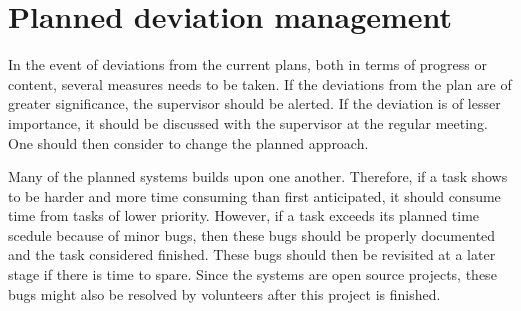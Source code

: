 \chapter{Planned deviation management}

In the event of deviations from the current plans, both in terms of progress or content, several measures needs to be taken. If the deviations from the plan are of greater significance, the supervisor should be alerted. If the deviation is of lesser importance, it should be discussed with the supervisor at the regular meeting. One should then consider to change the planned approach.

Many of the planned systems builds upon one another. Therefore, if a task shows to be harder and more time consuming than first anticipated, it should consume time from tasks of lower priority. However, if a task exceeds its planned time scedule because of minor bugs, then these bugs should be properly documented and the task considered finished. These bugs should then be revisited at a later stage if there is time to spare. Since the systems are open source projects, these bugs might also be resolved by volunteers after this project is finished.
